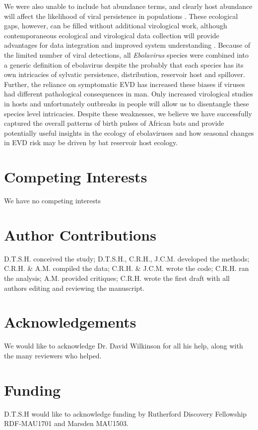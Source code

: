 \documentclass[a4paper,twoside, onecolumn]{article}
\begin{document}
	We were also unable to include bat abundance terms, and clearly host abundance will affect the likelihood of viral persistence in populations \cite{Hayman2015, Pourrut2009}. These ecological gaps, however, can be filled without additional virological work, although contemporaneous ecological and virological data collection will provide advantages for data integration and improved system understanding \cite{Rulli2017,Pourrut2009,Amman2012, Restif2012}. Because of the limited number of viral detections, all \textit{Ebolavirus} species were combined into a generic definition of ebolavirus despite the probably that each species has its own intricacies of sylvatic persistence, distribution, reservoir host and spillover. Further, the reliance on symptomatic EVD has increased these biases if viruses had different pathological consequences in man. Only increased virological studies in hosts and unfortunately outbreaks in people will allow us to disentangle these species level intricacies. Despite these weaknesses, we believe we have successfully captured the overall patterns of birth pulses of African bats and provide potentially useful insights in the ecology of ebolaviruses and how seasonal changes in EVD risk may be driven by bat reservoir host ecology.\par

	\section*{Competing Interests}
	We have no competing interests
	
	\section*{Author Contributions}
	D.T.S.H. conceived the study;
	D.T.S.H., C.R.H., J.C.M. developed the methods;
	C.R.H. \& A.M. compiled the data;
	C.R.H. \& J.C.M. wrote the code;
	C.R.H. ran the analysis;
	A.M. provided critiques;
	C.R.H. wrote the first draft with all authors editing and reviewing the manuscript.
	
	\section*{Acknowledgements}
	We would like to acknowledge Dr. David Wilkinson for all his help, along with the many reviewers who helped.
	
	\section*{Funding}
	D.T.S.H would like to acknowledge funding by Rutherford Discovery Fellowship RDF-MAU1701 and Marsden MAU1503.
	
	
	
\end{document}
